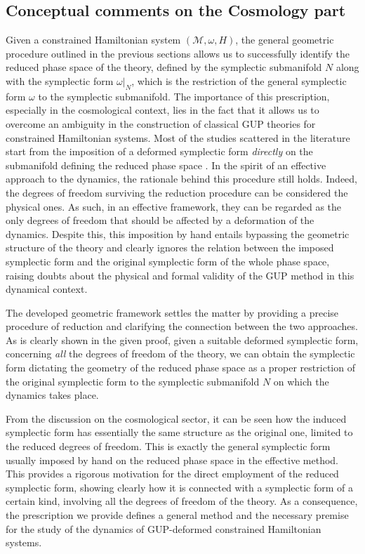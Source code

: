 \documentclass{article}
\numberwithin{equation}{section}
\theoremstyle{definition}
\begin{document}
\subsection{Conceptual comments on the Cosmology part}

Given a constrained Hamiltonian system \((\mathcal{M}, \omega, H)\), the general geometric procedure outlined in the previous sections allows us to successfully identify the reduced phase space of the theory, defined by the symplectic submanifold \(N\) along with the symplectic form \(\omega|_N\), which is the restriction of the general symplectic form \(\omega\) to the symplectic submanifold.  
The importance of this prescription, especially in the cosmological context, lies in the fact that it allows us to overcome an ambiguity in the construction of classical GUP theories for constrained Hamiltonian systems.  
Most of the studies scattered in the literature start from the imposition of a deformed symplectic form \emph{directly} on the submanifold defining the reduced phase space \cite{segreto2025dynamics, battisti2009mixmaster}.  
In the spirit of an effective approach to the dynamics, the rationale behind this procedure still holds.  
Indeed, the degrees of freedom surviving the reduction procedure can be considered the physical ones. As such, in an effective framework, they can be regarded as the only degrees of freedom that should be affected by a deformation of the dynamics.  
Despite this, this imposition by hand entails bypassing the geometric structure of the theory and clearly ignores the relation between the imposed symplectic form and the original symplectic form of the whole phase space, raising doubts about the physical and formal validity of the GUP method in this dynamical context.

The developed geometric framework settles the matter by providing a precise procedure of reduction and clarifying the connection between the two approaches.  
As is clearly shown in the given proof, given a suitable deformed symplectic form, concerning \emph{all} the degrees of freedom of the theory, we can obtain the symplectic form dictating the geometry of the reduced phase space as a proper restriction of the original symplectic form to the symplectic submanifold \(N\) on which the dynamics takes place.

From the discussion on the cosmological sector, it can be seen how the induced symplectic form  
has essentially the same structure as the original one, limited to the reduced degrees of freedom. This is exactly the general symplectic form usually imposed by hand on the reduced phase space in the effective method.  
This provides a rigorous motivation for the direct employment of the reduced symplectic form, showing clearly how it is connected with a symplectic form of a certain kind, involving all the degrees of freedom of the theory.  
As a consequence, the prescription we provide defines a general method and the necessary premise for the study of the dynamics of GUP-deformed constrained Hamiltonian systems.
\end{document}
